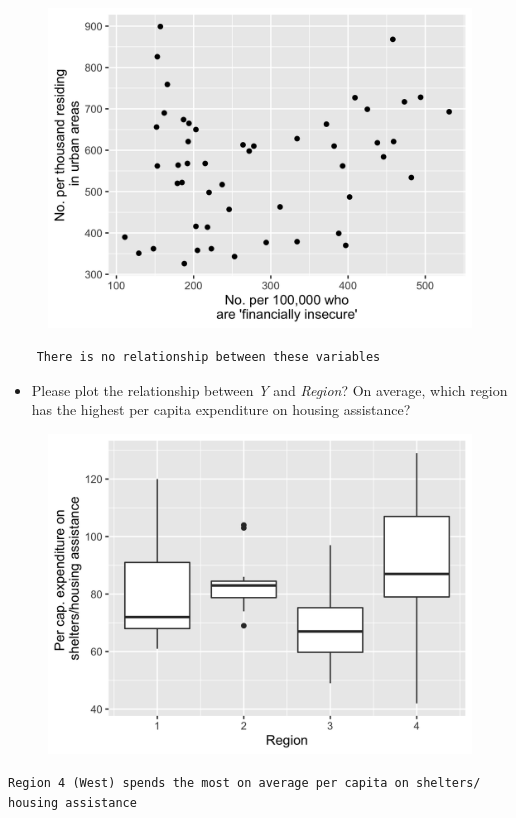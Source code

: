 \documentclass[12pt,letterpaper]{article}
\begin{document}
\begin{figure}[H]
	\centering
	\includegraphics[width=0.7\linewidth]{../plot6}
	\caption{}
	\label{fig:plot6}
\end{figure}

	\begin{verbatim}
	There is no relationship between these variables 
\end{verbatim}
	\vspace{1cm}



		\begin{itemize}
			\item 	Please plot the relationship between \emph{Y} and \emph{Region}? On average, which region has the highest per capita expenditure on housing assistance?
		\end{itemize}

	
		\begin{figure}[H]
			\centering
			\includegraphics[width=0.7\linewidth]{../plot7}
			\caption{}
			\label{fig:plot7}
		\end{figure}

	\begin{verbatim}
Region 4 (West) spends the most on average per capita on shelters/ housing assistance
\end{verbatim}
	\vspace{10cm}
\end{document}
